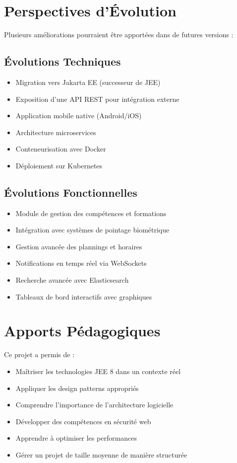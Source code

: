 \documentclass[12pt,a4paper,twoside]{report}
\begin{document}
\section{Perspectives d'Évolution}

Plusieurs améliorations pourraient être apportées dans de futures versions :

\subsection{Évolutions Techniques}
\begin{itemize}
    \item Migration vers Jakarta EE (successeur de JEE)
    \item Exposition d'une API REST pour intégration externe
    \item Application mobile native (Android/iOS)
    \item Architecture microservices
    \item Conteneurisation avec Docker
    \item Déploiement sur Kubernetes
\end{itemize}

\subsection{Évolutions Fonctionnelles}
\begin{itemize}
    \item Module de gestion des compétences et formations
    \item Intégration avec systèmes de pointage biométrique
    \item Gestion avancée des plannings et horaires
    \item Notifications en temps réel via WebSockets
    \item Recherche avancée avec Elasticsearch
    \item Tableaux de bord interactifs avec graphiques
\end{itemize}

\section{Apports Pédagogiques}

Ce projet a permis de :
\begin{itemize}
    \item Maîtriser les technologies JEE 8 dans un contexte réel
    \item Appliquer les design patterns appropriés
    \item Comprendre l'importance de l'architecture logicielle
    \item Développer des compétences en sécurité web
    \item Apprendre à optimiser les performances
    \item Gérer un projet de taille moyenne de manière structurée
\end{itemize}
\end{document}
